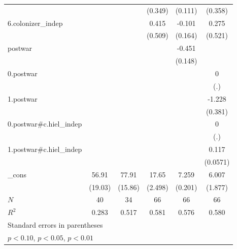 {\begin{tabular}{l*{5}{c}}
            &                     &                     &     (0.349)         &     (0.111)         &     (0.358)         \\
[1em]
6.colonizer\_indep&                     &                     &       0.415         &      -0.101         &       0.275         \\
            &                     &                     &     (0.509)         &     (0.164)         &     (0.521)         \\
[1em]
postwar     &                     &                     &                     &      -0.451\sym{**} &                     \\
            &                     &                     &                     &     (0.148)         &                     \\
[1em]
0.postwar   &                     &                     &                     &                     &           0         \\
            &                     &                     &                     &                     &         (.)         \\
[1em]
1.postwar   &                     &                     &                     &                     &      -1.228\sym{**} \\
            &                     &                     &                     &                     &     (0.381)         \\
[1em]
0.postwar#c.hiel\_indep&                     &                     &                     &                     &           0         \\
            &                     &                     &                     &                     &         (.)         \\
[1em]
1.postwar#c.hiel\_indep&                     &                     &                     &                     &       0.117\sym{*}  \\
            &                     &                     &                     &                     &    (0.0571)         \\
[1em]
\_cons      &       56.91\sym{**} &       77.91\sym{***}&       17.65\sym{***}&       7.259\sym{***}&       6.007\sym{**} \\
            &     (19.03)         &     (15.86)         &     (2.498)         &     (0.201)         &     (1.877)         \\
\hline
\(N\)       &          40         &          34         &          66         &          66         &          66         \\
\(R^{2}\)   &       0.283         &       0.517         &       0.581         &       0.576         &       0.580         \\
\hline\hline
\multicolumn{6}{l}{\footnotesize Standard errors in parentheses}\\
\multicolumn{6}{l}{\footnotesize \sym{*} \(p<0.10\), \sym{**} \(p<0.05\), \sym{***} \(p<0.01\)}\\
\end{tabular}
}
